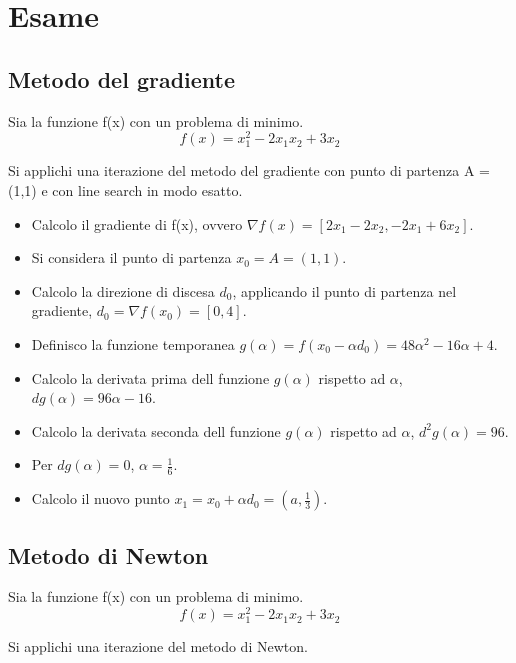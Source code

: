\chapter{Esame}

\section{Metodo del gradiente}

Sia la funzione f(x) con un problema di minimo.
\[
  f(x) = x_1 ^ 2 - 2 x_1 x_2 + 3 x_2
\]

Si applichi una iterazione del metodo del gradiente con punto di partenza A = (1,1) e con line search in modo esatto.

\begin{itemize}
  \item Calcolo il gradiente di f(x), ovvero $\nabla f(x) = [2 x_1 - 2 x_2, -2 x_1 + 6 x_2]$.
  \item Si considera il punto di partenza $x_0 = A = (1,1)$.
  \item Calcolo la direzione di discesa $d_0$, applicando il punto di partenza nel gradiente, $d_0 = \nabla f(x_0) = [0,4]$.
  \item Definisco la funzione temporanea $g(\alpha) = f(x_0 - \alpha d_0) = 48 \alpha ^ 2 - 16 \alpha + 4$.
  \item Calcolo la derivata prima dell funzione $g(\alpha)$ rispetto ad $\alpha$, $dg(\alpha) = 96 \alpha - 16$.
  \item Calcolo la derivata seconda dell funzione $g(\alpha)$ rispetto ad $\alpha$, $d^2g(\alpha) = 96$.
  \item Per $dg(\alpha) = 0$, $\alpha = \frac 1 6$.
  \item Calcolo il nuovo punto $x_1 = x_0 + \alpha d_0 = (a, \frac 1 3)$.
\end{itemize}

\section{Metodo di Newton}

Sia la funzione f(x) con un problema di minimo.
\[
  f(x) = x_1 ^ 2 - 2 x_1 x_2 + 3 x_2
\]

Si applichi una iterazione del metodo di Newton.


